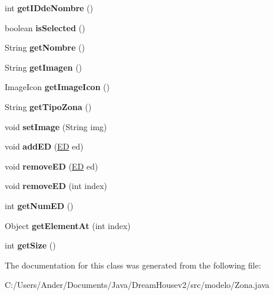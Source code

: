 \begin{DoxyCompactItemize}
\mbox{\label{classmodelo_1_1_zona_a3f19a287ed34e23a6e920667187d3931}} 
int {\bfseries get\+I\+Dde\+Nombre} ()
\item 
\mbox{\label{classmodelo_1_1_zona_a9c7d00fa6e4da7272eb6a65c9a9d2767}} 
boolean {\bfseries is\+Selected} ()
\item 
\mbox{\label{classmodelo_1_1_zona_a28cb5dc309900413ca5ad95d30c5e082}} 
String {\bfseries get\+Nombre} ()
\item 
\mbox{\label{classmodelo_1_1_zona_ad988daf789b23fd40c0356dc5e293ddd}} 
String {\bfseries get\+Imagen} ()
\item 
\mbox{\label{classmodelo_1_1_zona_a8b48e585e0379b779430d69eceaac0b1}} 
Image\+Icon {\bfseries get\+Image\+Icon} ()
\item 
\mbox{\label{classmodelo_1_1_zona_a557d1e8f998f1a3bbe7ce4375a1741cb}} 
String {\bfseries get\+Tipo\+Zona} ()
\item 
\mbox{\label{classmodelo_1_1_zona_a101ca1e5677f231a0d02ff639b852742}} 
void {\bfseries set\+Image} (String img)
\item 
\mbox{\label{classmodelo_1_1_zona_af72f99a868712802184140b5e811d0fd}} 
void {\bfseries add\+ED} (\mbox{\hyperlink{classmodelo_1_1_e_d}{ED}} ed)
\item 
\mbox{\label{classmodelo_1_1_zona_aabd279b6af1a86bb1c761887d9de8ceb}} 
void {\bfseries remove\+ED} (\mbox{\hyperlink{classmodelo_1_1_e_d}{ED}} ed)
\item 
\mbox{\label{classmodelo_1_1_zona_abd7cb122f705c96dfa8e1ac4856dd17d}} 
void {\bfseries remove\+ED} (int index)
\item 
\mbox{\label{classmodelo_1_1_zona_a58d50274740c05a3a0c04b2a023c3d84}} 
int {\bfseries get\+Num\+ED} ()
\item 
\mbox{\label{classmodelo_1_1_zona_ad1781d96d3ed190531dd3bc34905339e}} 
Object {\bfseries get\+Element\+At} (int index)
\item 
\mbox{\label{classmodelo_1_1_zona_a9831f30d3c5b31050915357f41d1e288}} 
int {\bfseries get\+Size} ()
\end{DoxyCompactItemize}


The documentation for this class was generated from the following file\+:\begin{DoxyCompactItemize}
\item 
C\+:/\+Users/\+Ander/\+Documents/\+Java/\+Dream\+Housev2/src/modelo/Zona.\+java\end{DoxyCompactItemize}
